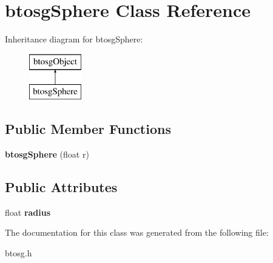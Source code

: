 \hypertarget{classbtosgSphere}{}\section{btosg\+Sphere Class Reference}
\label{classbtosgSphere}
Inheritance diagram for btosg\+Sphere\+:\begin{figure}[H]
\begin{center}
\leavevmode
\includegraphics[height=2.000000cm]{classbtosgSphere}
\end{center}
\end{figure}
\subsection*{Public Member Functions}
\begin{DoxyCompactItemize}
\item 
\mbox{\label{classbtosgSphere_a39cc5391405e85edcef16200b52e905c}} 
{\bfseries btosg\+Sphere} (float r)
\end{DoxyCompactItemize}
\subsection*{Public Attributes}
\begin{DoxyCompactItemize}
\item 
\mbox{\label{classbtosgSphere_afd570c85e9ce1b15b2b4b378e4f6abeb}} 
float {\bfseries radius}
\end{DoxyCompactItemize}


The documentation for this class was generated from the following file\+:\begin{DoxyCompactItemize}
\item 
btosg.\+h\end{DoxyCompactItemize}
